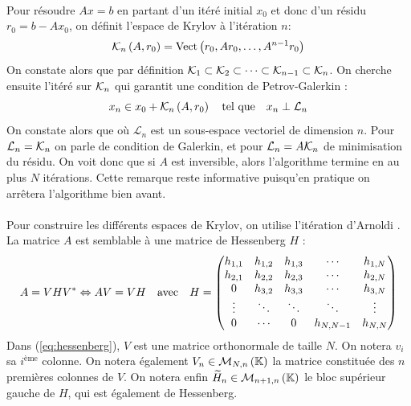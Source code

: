 		\paragraph{}
		Pour résoudre $Ax = b$ en partant d'un itéré initial $x_0$ et donc d'un résidu $r_0 = b - Ax_0$, on définit l'espace de Krylov à l'itération $n$:
		\begin{equation}\label{eqn:krylov}
			\krylov[A, r_0]{n} = \operatorname{Vect}\left(r_0, Ar_0, \dots, A^{n-1}r_0\right)
		\end{equation}
		On constate alors que par définition $\krylov{1}\subset\krylov{2}\subset\dots\subset\krylov{n-1}\subset\krylov{n}$.
		On cherche ensuite l'itéré sur $\krylov{n}$ qui garantit une condition de Petrov-Galerkin \cite{SimonciniSzyld2007} :
		\begin{equation}\label{eqn:x_n}
			x_n \in x_0 + \krylov[A, r_0]{n}\quad\textrm{tel que}\quad x_n \perp \mathcal{L}_n
		\end{equation}On constate alors que
		où $\mathcal{L}_n$ est un sous-espace vectoriel de dimension $n$.
		Pour $\mathcal{L}_n = \krylov{n}$ on parle de condition de Galerkin, et pour $\mathcal{L}_n = A\krylov{n}$ de minimisation du résidu.
		On voit donc que si $A$ est inversible, alors l'algorithme termine en au plus $N$ itérations.
		Cette remarque reste informative puisqu'en pratique on arrêtera l'algorithme bien avant.

		\paragraph{}
		Pour construire les différents espaces de Krylov, on utilise l'itération d'Arnoldi \cite{TrefethenBau1997}.
		La matrice $A$ est semblable à une matrice de Hessenberg $H$ :
		\begin{equation}\label{eq:hessenberg}
			A = VH{V}^*\Leftrightarrow AV = VH\quad\textrm{avec}\quad H=
			\begin{pmatrix}
				h_{1,1}&h_{1,2}&h_{1,3}&\cdots &h_{1,N}\\
				h_{2,1}&h_{2,2}&h_{2,3}&\cdots &h_{2,N}\\
				0      &h_{3,2}&h_{3,3}&\cdots &h_{3,N}\\
				\vdots &\ddots &\ddots &\ddots &\vdots \\
				0      &\cdots &0      &h_{N,N-1}&h_{N,N}
			\end{pmatrix}
		\end{equation}
		Dans (\ref{eq:hessenberg}), $V$ est une matrice orthonormale de taille $N$.
		On notera $v_i$ sa $i^{\textrm{ème}}$ colonne.
		On notera également $V_n\in\mathcal{M}_{N, n}\left(\mathbb{K}\right)$ la matrice constituée des $n$ premières colonnes de $V$.
		On notera enfin $\widetilde{H}_n\in\mathcal{M}_{n+1, n}\left(\mathbb{K}\right)$ le bloc supérieur gauche de $H$, qui est également de Hessenberg.

